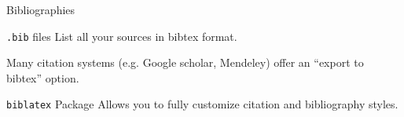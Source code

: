 \documentclass[xcolor={dvipsnames}]{beamer}
\begin{document}
\begin{frame}{Bibliographies}
\begin{block}{\texttt{.bib} files}
List all your sources in bibtex format.

Many citation systems (e.g. Google scholar, Mendeley) offer an ``export to bibtex'' option.
\end{block}
\begin{block}{\texttt{biblatex} Package}
Allows you to fully customize citation and bibliography styles.
\end{block}
\end{frame}
\end{document}

